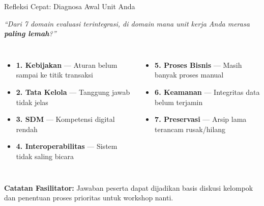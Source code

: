 \documentclass[aspectratio=169,11pt]{beamer}
\begin{document}
\begin{frame}{Refleksi Cepat: Diagnosa Awal Unit Anda}
    \vspace{0.3cm}
    \begin{premiumbox}
        \large
        \centering
        \textit{``Dari 7 domain evaluasi terintegrasi, di domain mana unit kerja Anda merasa \textbf{paling lemah}?''}
    \end{premiumbox}
    \vspace{0.3cm}
    \begin{columns}[T]
        \begin{itemize}
            \scriptsize
            \item[$\square$] \textbf{1. Kebijakan} --- Aturan belum sampai ke titik transaksi
            \item[$\square$] \textbf{2. Tata Kelola} --- Tanggung jawab tidak jelas
            \item[$\square$] \textbf{3. SDM} --- Kompetensi digital rendah
            \item[$\square$] \textbf{4. Interoperabilitas} --- Sistem tidak saling bicara
        \end{itemize}
        
        \begin{itemize}
            \scriptsize
            \item[$\square$] \textbf{5. Proses Bisnis} --- Masih banyak proses manual
            \item[$\square$] \textbf{6. Keamanan} --- Integritas data belum terjamin
            \item[$\square$] \textbf{7. Preservasi} --- Arsip lama terancam rusak/hilang
        \end{itemize}
    \end{columns}
    \vspace{0.3cm}
    \begin{orangebox}
        \scriptsize \textbf{Catatan Fasilitator:} Jawaban peserta dapat dijadikan basis diskusi kelompok dan penentuan proses prioritas untuk workshop nanti.
    \end{orangebox}
\end{frame}
\end{document}
